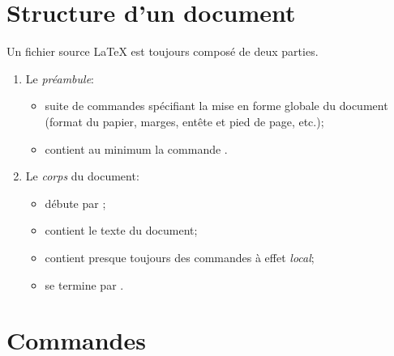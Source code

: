 \section{Structure d'un document}

Un fichier source {\LaTeX} est toujours composé de deux parties.

\begin{enumerate}
\item Le \emph{préambule}:
  \begin{itemize}
  \item suite de commandes spécifiant la mise en forme globale
    du document (format du papier, marges, entête et pied de page,
    etc.);
  \item contient au minimum la commande \cmd{\documentclass}.
  \end{itemize}
\item Le \emph{corps} du document:
  \begin{itemize}
  \item débute par \verb==;
    \item contient le texte du document;
    \item contient presque toujours des commandes à effet
      \emph{local};
    \item se termine par \verb==.
  \end{itemize}
\end{enumerate}


\section{Commandes}

